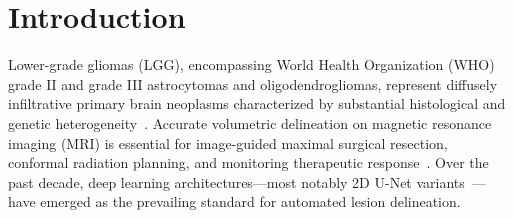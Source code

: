 \documentclass[11pt,a4paper]{article}
\begin{document}
\vspace{1.5em}

\section{Introduction}
\label{sec:intro}

Lower-grade gliomas (LGG), encompassing World Health Organization (WHO) grade II and grade III astrocytomas and oligodendrogliomas, represent diffusely infiltrative primary brain neoplasms characterized by substantial histological and genetic heterogeneity~\cite{louis20212021,ceccarelli2016molecular}. Accurate volumetric delineation on magnetic resonance imaging (MRI) is essential for image-guided maximal surgical resection, conformal radiation planning, and monitoring therapeutic response~\cite{buda2019association}. Over the past decade, deep learning architectures---most notably 2D U-Net variants~\cite{ronneberger2015u,zhou2018unetplusplus,oktay2018attention}---have emerged as the prevailing standard for automated lesion delineation. 
\end{document}
